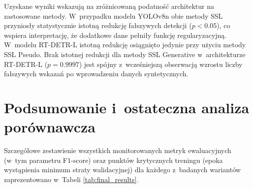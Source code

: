 \begin{table}[htbp]
\centering
\caption{Analiza statystyczna redukcji liczby fałszywych detekcji (FP) na zbiorze walidacyjnym przy użyciu testu Wilcoxona.}
\label{tab:stat_analysis}
\end{table}
Uzyskane wyniki wskazują na zróżnicowaną podatność architektur na zastosowane metody. W~przypadku modelu YOLOv8n obie metody SSL przyniosły statystycznie istotną redukcję fałszywych detekcji ($p < 0.05$), co wspiera interpretację, że dodatkowe dane pełniły funkcję regularyzacyjną. W~modelu RT-DETR-L istotną redukcję osiągnięto jedynie przy użyciu metody SSL Pseudo. Brak istotnej redukcji dla metody SSL Generative w~architekturze RT-DETR-L ($p=0.9997$) jest spójny z~wcześniejszą obserwacją wzrostu liczby fałszywych wskazań po wprowadzeniu danych syntetycznych.

\section{Podsumowanie i~ostateczna analiza porównawcza}

Szczegółowe zestawienie wszystkich monitorowanych metryk ewaluacyjnych (w~tym parametru F1-score) oraz punktów krytycznych treningu (epoka wystąpienia minimum straty walidacyjnej) dla każdego z~badanych wariantów zaprezentowano w~Tabeli \ref{tab:final_results}. 

